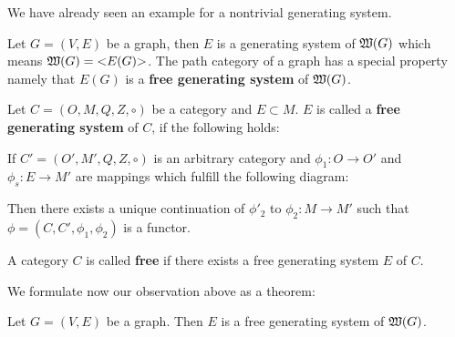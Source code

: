 We have already seen an example for a nontrivial generating system.

Let $G=(V,E)$ be a graph, then $E$ is a generating system of $\mbox{$\mathfrak{W}(G)$}$
which means $\mbox{$\mathfrak{W}(G)$} = \mbox{${<}E(G){>}$}$. The path category of a graph
has a special property namely that $E(G)$ is a {\bf free generating system} of
$\mbox{$\mathfrak{W}(G)$}$.

\begin{definition}
Let $C = (O, M, Q, Z, \circ)$ be a category and $E \subset M$. $E$ is called a
{\bf free generating system} of $C$, if the following holds:

If $C' = (O', M', Q, Z, \circ)$ is an arbitrary category and $\phi_1 : O \to O'$
and $\phi_s : E \to M'$ are mappings which fulfill the following diagram:

\begin{center}
\end{center}

Then there exists a unique continuation of $\phi'_2$ to $\phi_2 : M \to M'$ such
that $\phi = (C, C', \phi_1, \phi_2)$ is a functor.
\end{definition}

\begin{definition}
A category $C$ is called {\bf free} if there exists a free generating system $E$
of $C$.
\end{definition}

We formulate now our observation above as a theorem:

\begin{theorem}
Let $G=(V, E)$ be a graph. Then $E$ is a free generating system of
$\mbox{$\mathfrak{W}(G)$}$.
\end{theorem}


